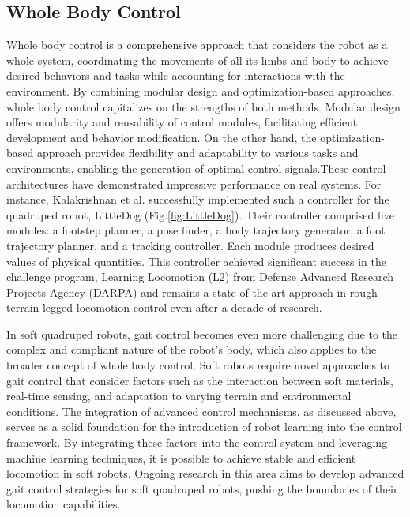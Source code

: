 \subsection{Whole Body Control}
Whole body control is a comprehensive approach that considers the robot as a whole system, coordinating the movements of all its limbs and body to achieve desired behaviors and tasks while accounting for interactions with the environment. By combining modular design and optimization-based approaches, whole body control capitalizes on the strengths of both methods. Modular design offers modularity and reusability of control modules, facilitating efficient development and behavior modification. On the other hand, the optimization-based approach provides flexibility and adaptability to various tasks and environments, enabling the generation of optimal control signals.These control architectures have demonstrated impressive performance on real systems. For instance, Kalakrishnan et al.\cite{kalakrishnanFastRobustQuadruped2010} successfully implemented such a controller for the quadruped robot, LittleDog (Fig.\ref{fig:LittleDog}). Their controller comprised five modules: a footstep planner, a pose finder, a body trajectory generator, a foot trajectory planner, and a tracking controller. Each module produces desired values of physical quantities. This controller achieved significant success in the challenge program\cite{neuhausComprehensiveSummaryInstitute2011}, Learning Locomotion (L2) from Defense Advanced Research Projects Agency (DARPA) and remains a state-of-the-art approach in rough-terrain legged locomotion control even after a decade of research.


In soft quadruped robots, gait control becomes even more challenging due to the complex and compliant nature of the robot's body, which also applies to the broader concept of whole body control. Soft robots require novel approaches to gait control that consider factors such as the interaction between soft materials, real-time sensing, and adaptation to varying terrain and environmental conditions. The integration of advanced control mechanisms, as discussed above, serves as a solid foundation for the introduction of robot learning into the control framework. By integrating these factors into the control system and leveraging machine learning techniques, it is possible to achieve stable and efficient locomotion in soft robots. Ongoing research in this area aims to develop advanced gait control strategies for soft quadruped robots, pushing the boundaries of their locomotion capabilities\cite{gongReviewGaitOptimization2010}.

